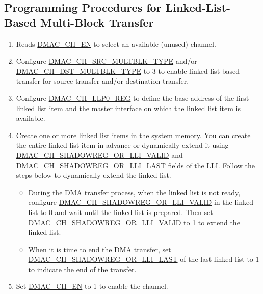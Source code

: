 \documentclass[main\_\_EN.tex]{subfiles}
\begin{document}
\subsection{Programming Procedures for Linked-List-Based Multi-Block Transfer}

\begin{enumerate}
    \item Reads \hyperref[fielddesc:DMACCH1EN]{DMAC\_CH\_EN} to select an available (unused) channel.

    \item Configure \hyperref[fielddesc:DMACCHNSRCMULTBLKTYPE]{DMAC\_CH\_SRC\_MULTBLK\_TYPE} and/or \hyperref[fielddesc:DMACCHNDSTMULTBLKTYPE]{DMAC\_CH\_DST\_MULTBLK\_TYPE} to 3 to enable linked-list-based transfer for source transfer and/or destination transfer.

    \item Configure \hyperref[regdesc:DMACCHNLLP0REG]{DMAC\_CH\_LLP0\_REG} to define the base address of the first linked list item and the master interface on which the linked list item is available.

    \item Create one or more linked list items in the system memory. You can create the entire linked list item in advance or dynamically extend it using \hyperref[fielddesc:DMACCHNSHADOWREGORLLIVALID]{DMAC\_CH\_SHADOWREG\_OR\_LLI\_VALID} and \hyperref[fielddesc:DMACCHNSHADOWREGORLLILAST]{DMAC\_CH\_SHADOWREG\_OR\_LLI\_LAST} fields of the LLI. Follow the steps below to dynamically extend the linked list.
    \begin{itemize}
        \item During the DMA transfer process, when the linked list is not ready, configure \hyperref[fielddesc:DMACCHNSHADOWREGORLLIVALID]{DMAC\_CH\_SHADOWREG\_OR\_LLI\_VALID} in the linked list to 0 and wait until the linked list is prepared. Then set \hyperref[fielddesc:DMACCHNSHADOWREGORLLIVALID]{DMAC\_CH\_SHADOWREG\_OR\_LLI\_VALID} to 1 to extend the linked list.
        \item When it is time to end the DMA transfer, set \hyperref[fielddesc:DMACCHNSHADOWREGORLLILAST]{DMAC\_CH\_SHADOWREG\_OR\_LLI\_LAST} of the last linked list to 1 to indicate the end of the transfer.
    \end{itemize}

    \item Set \hyperref[fielddesc:DMACCH1EN]{DMAC\_CH\_EN} to 1 to enable the channel.


\end{enumerate}
\end{document}
